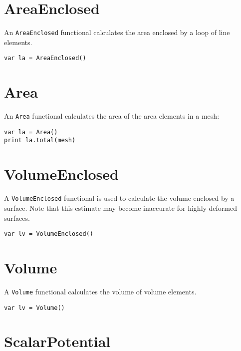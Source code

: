 \hypertarget{areaenclosed}{%
\section{AreaEnclosed}\label{areaenclosed}}

An \texttt{AreaEnclosed} functional calculates the area enclosed by a
loop of line elements.

\begin{lstlisting}
var la = AreaEnclosed()
\end{lstlisting}

\hypertarget{area}{%
\section{Area}\label{area}}

An \texttt{Area} functional calculates the area of the area elements in
a mesh:

\begin{lstlisting}
var la = Area()
print la.total(mesh)
\end{lstlisting}

\hypertarget{volumeenclosed}{%
\section{VolumeEnclosed}\label{volumeenclosed}}

A \texttt{VolumeEnclosed} functional is used to calculate the volume
enclosed by a surface. Note that this estimate may become inaccurate for
highly deformed surfaces.

\begin{lstlisting}
var lv = VolumeEnclosed()
\end{lstlisting}

\hypertarget{volume}{%
\section{Volume}\label{volume}}

A \texttt{Volume} functional calculates the volume of volume elements.

\begin{lstlisting}
var lv = Volume()
\end{lstlisting}

\hypertarget{scalarpotential}{%
\section{ScalarPotential}\label{scalarpotential}}

